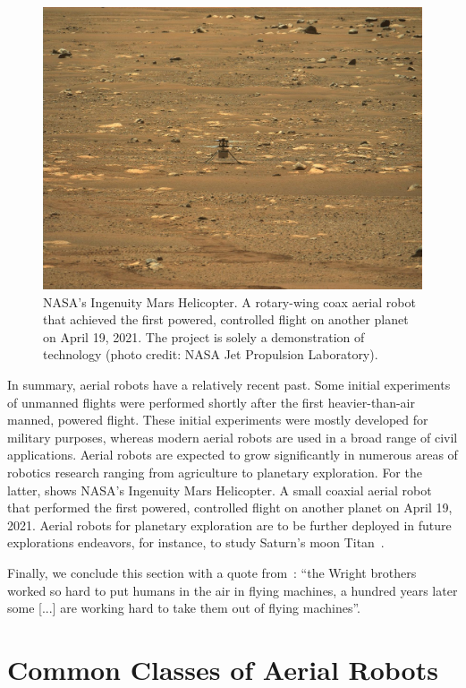 \begin{figure}[t]
  \sfr
  \centering
  \includegraphics[width=.7\textwidth]{pictures/jpegPIA24550}
  \caption[NASA's Ingenuity Mars Helicopter]{NASA's Ingenuity Mars Helicopter. A rotary-wing coax aerial robot that achieved the first powered, controlled flight on another planet on April 19, 2021. The project is solely a demonstration of technology {\scriptsize(photo credit: NASA Jet Propulsion Laboratory)}.}   
  \label{fig:ingenuity}
  \efr
\end{figure}

In summary, aerial robots have a relatively recent past. Some initial experiments of unmanned flights were performed shortly after the first heavier-than-air manned, powered flight. These initial experiments were mostly developed for military purposes, whereas modern aerial robots are used in a broad range of civil applications. Aerial robots are expected to grow significantly in numerous areas of robotics research ranging from agriculture to planetary exploration. For the latter,  shows NASA's Ingenuity Mars Helicopter. A small coaxial aerial robot that performed the first powered, controlled flight on another planet on April 19, 2021. Aerial robots for planetary exploration are to be further deployed in future explorations endeavors, for instance, to study Saturn's moon Titan~\citep{voosen2019nasa}.

Finally, we conclude this section with a quote from~\citep{anderson2005introduction}: ``the Wright brothers worked so hard to put humans in the air in flying machines, a hundred years later some [...] are working hard to take them out of flying machines''.


\section{Common Classes of Aerial Robots}
\label{sec:aerial-robo-types}

